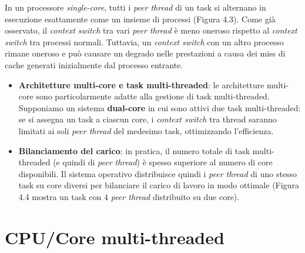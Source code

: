 In un processore \textit{single-core}, tutti i \textit{peer thread} di un task si alternano in esecuzione esattamente come un insieme di processi (Figura 4.3). Come già osservato, il \textit{context switch} tra vari \textit{peer thread} è meno oneroso rispetto al \textit{context switch} tra processi normali. Tuttavia, un \textit{context switch} con un altro processo rimane oneroso e può causare un degrado nelle prestazioni a causa dei miss di cache generati inizialmente dal processo entrante.

\begin{itemize}
    \item \textbf{Architetture multi-core e task multi-threaded}: le architetture multi-core sono particolarmente adatte alla gestione di task multi-threaded. Supponiamo un sistema \textbf{dual-core} in cui sono attivi due task multi-threaded: se si assegna un task a ciascun core, i \textit{context switch} tra thread saranno limitati ai soli \textit{peer thread} del medesimo task, ottimizzando l’efficienza.
    \item \textbf{Bilanciamento del carico}: in pratica, il numero totale di task multi-threaded (e quindi di \textit{peer thread}) è spesso superiore al numero di core disponibili. Il sistema operativo distribuisce quindi i \textit{peer thread} di uno stesso task su core diversi per bilanciare il carico di lavoro in modo ottimale (Figura 4.4 mostra un task con 4 \textit{peer thread} distribuito su due core).
\end{itemize}



\section{CPU/Core multi-threaded}

